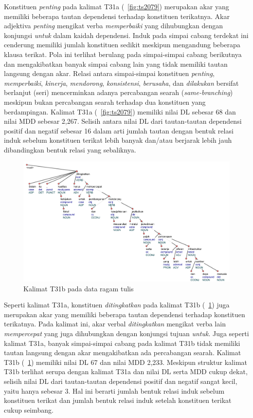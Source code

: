 Konstituen \textit{penting} pada kalimat T31a (\pic~\ref{fig:ts2079}) merupakan akar yang memiliki beberapa tautan dependensi terhadap konstituen terikatnya. Akar adjektiva \textit{penting} mengikat verba \textit{memperbaiki} yang dihubungkan dengan konjungsi \textit{untuk} dalam kaidah dependensi. Induk pada simpai cabang terdekat ini cenderung memiliki jumlah konstituen sedikit meskipun mengandung beberapa klausa terikat. Pola ini terlihat berulang pada simpai-simpai cabang berikutnya dan mengakibatkan banyak simpai cabang lain yang tidak memiliki tautan langsung dengan akar. Relasi antara simpai-simpai konstituen \textit{penting}, \textit{memperbaiki}, \textit{kinerja}, \textit{mendorong}, \textit{konsistensi}, \textit{berusaha}, dan \textit{dilakukan} bersifat berlanjut (seri) mencerminkan adanya percabangan searah (\textit{same-branching}) meskipun bukan percabangan searah terhadap dua konstituen yang berdampingan. Kalimat T31a (\pic~\ref{fig:ts2079}) memiliki nilai DL sebesar 68 dan nilai MDD sebesar 2,267. Selisih antara nilai DL dari tautan-tautan dependensi positif dan negatif sebesar 16 dalam arti jumlah tautan dengan bentuk relasi induk sebelum konstituen terikat lebih banyak dan/atau berjarak lebih jauh dibandingkan bentuk relasi yang sebaliknya.

\begin{figure}
	\centering \includegraphics[width=1
	\textwidth] {pics/ts2081.jpg} 
	\caption{Kalimat T31b pada data ragam tulis} 
	\label{fig:ts2081} 
\end{figure}

Seperti kalimat T31a, konstituen \textit{ditingkatkan} pada kalimat T31b (\pic~\ref{fig:ts2081}) juga merupakan akar yang memiliki beberapa tautan dependensi terhadap konstituen terikatnya. Pada kalimat ini, akar verbal \textit{ditingkatkan} mengikat verba lain \textit{mempercepat} yang juga dihubungkan dengan konjungsi tujuan \textit{untuk}. Juga seperti kalimat T31a, banyak simpai-simpai cabang pada kalimat T31b tidak memiliki tautan langsung dengan akar mengakibatkan ada percabangan searah. Kalimat T31b (\pic~\ref{fig:ts2081}) memiliki nilai DL 67 dan nilai MDD 2,233. Meskipun struktur kalimat T31b terlihat serupa dengan kalimat T31a dan nilai DL serta MDD cukup dekat, selisih nilai DL dari tautan-tautan dependensi positif dan negatif sangat kecil, yaitu hanya sebesar 3. Hal ini berarti jumlah bentuk relasi induk sebelum konstituen terikat dan jumlah bentuk relasi induk setelah konstituen terikat cukup seimbang. 

